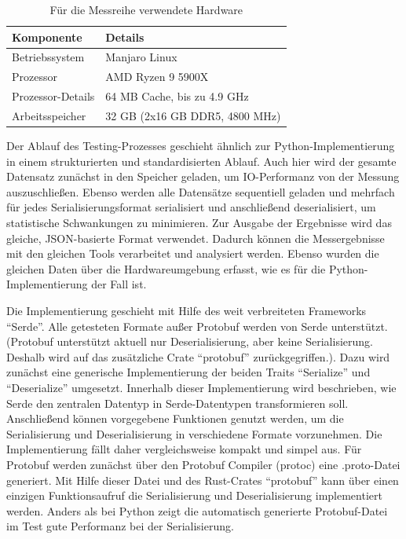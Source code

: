 \documentclass[ngerman]{seminarvorlage}
\begin{document}
\begin{table}[H]
  \centering
  \begin{tabular}{|l|l|}
  \hline
  \textbf{Komponente}         & \textbf{Details}                     \\ \hline
  Betriebssystem              & Manjaro Linux                        \\ \hline
  Prozessor                   & AMD Ryzen 9 5900X                    \\ \hline
  Prozessor-Details           & 64 MB Cache, bis zu 4.9 GHz          \\ \hline
  Arbeitsspeicher             & 32 GB (2x16 GB DDR5, 4800 MHz)       \\ \hline
  \end{tabular}
  \caption{Für die Messreihe verwendete Hardware}
  \label{tab:hardware_rust}
\end{table}

Der Ablauf des Testing-Prozesses geschieht ähnlich zur Python-Implementierung in einem strukturierten und standardisierten Ablauf. Auch hier wird der gesamte Datensatz zunächst in den Speicher geladen, um IO-Performanz von der Messung auszuschließen. Ebenso werden alle Datensätze sequentiell geladen und mehrfach für jedes Serialisierungsformat serialisiert und anschließend deserialisiert, um statistische Schwankungen zu minimieren. Zur Ausgabe der Ergebnisse wird das gleiche, JSON-basierte Format verwendet. Dadurch können die Messergebnisse mit den gleichen Tools verarbeitet und analysiert werden. Ebenso wurden die gleichen Daten über die Hardwareumgebung erfasst, wie es für die Python-Implementierung der Fall ist.

Die Implementierung geschieht mit Hilfe des weit verbreiteten \cite{serde} Frameworks ``Serde''. Alle getesteten Formate außer Protobuf werden von Serde unterstützt. (Protobuf unterstützt aktuell nur Deserialisierung, aber keine Serialisierung. Deshalb wird auf das zusätzliche Crate ``protobuf'' zurückgegriffen.). Dazu wird zunächst eine generische Implementierung der beiden Traits ``Serialize'' und ``Deserialize'' umgesetzt. Innerhalb dieser Implementierung wird beschrieben, wie Serde den zentralen Datentyp in Serde-Datentypen transformieren soll. Anschließend können vorgegebene Funktionen genutzt werden, um die Serialisierung und Deserialisierung in verschiedene Formate vorzunehmen. Die Implementierung fällt daher vergleichsweise kompakt und simpel aus. Für Protobuf werden zunächst über den Protobuf Compiler (protoc) eine .proto-Datei generiert. Mit Hilfe dieser Datei und des Rust-Crates ``protobuf'' kann über einen einzigen Funktionsaufruf die Serialisierung und Deserialisierung implementiert werden. Anders als bei Python zeigt die automatisch generierte Protobuf-Datei im Test gute Performanz bei der Serialisierung.
\end{document}
